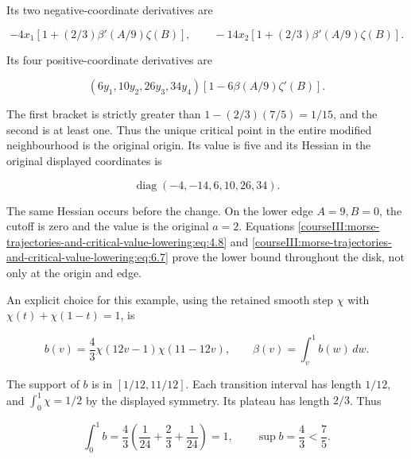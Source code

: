 Its two negative-coordinate derivatives are

\begin{equation}
-4x_1[1+(2/3)\beta'(A/9)\zeta(B)],
 \qquad
 -14x_2[1+(2/3)\beta'(A/9)\zeta(B)].
 \label{courseIII:morse-trajectories-and-critical-value-lowering:eq:6.7}
\end{equation}

Its four positive-coordinate derivatives are

\begin{equation}
(6y_1,10y_2,26y_3,34y_4)
       [1-6\beta(A/9)\zeta'(B)].
 \label{courseIII:morse-trajectories-and-critical-value-lowering:eq:6.8}
\end{equation}

The first bracket is strictly greater than
\(1-(2/3)(7/5)=1/15\), and the second is at least one. Thus the unique critical point in the entire modified neighbourhood is the original origin. Its value is five and its Hessian in the original displayed coordinates is

\begin{equation}
\operatorname{diag}(-4,-14,6,10,26,34).
 \label{courseIII:morse-trajectories-and-critical-value-lowering:eq:6.9}
\end{equation}

The same Hessian occurs before the change. On the lower edge \(A=9,B=0\), the cutoff is zero and the value is the original \(a=2\). Equations \eqref{courseIII:morse-trajectories-and-critical-value-lowering:eq:4.8} and \eqref{courseIII:morse-trajectories-and-critical-value-lowering:eq:6.7} prove the lower bound throughout the disk, not only at the origin and edge.

An explicit choice for this example, using the retained smooth step \(\chi\) with \(\chi(t)+\chi(1-t)=1\), is

\begin{equation}
b(v)=\frac43\chi(12v-1)\chi(11-12v),
 \qquad \beta(v)=\int_v^1b(w)\,dw.
 \label{courseIII:morse-trajectories-and-critical-value-lowering:eq:6.10}
\end{equation}

The support of \(b\) is in \([1/12,11/12]\). Each transition interval has length \(1/12\), and \(\int_0^1\chi=1/2\) by the displayed symmetry. Its plateau has length \(2/3\). Thus

\begin{equation}
\int_0^1b=\frac43\left(\frac1{24}+\frac23+\frac1{24}\right)=1,
 \qquad \sup b=\frac43<\frac75.
 \label{courseIII:morse-trajectories-and-critical-value-lowering:eq:6.11}
\end{equation}

